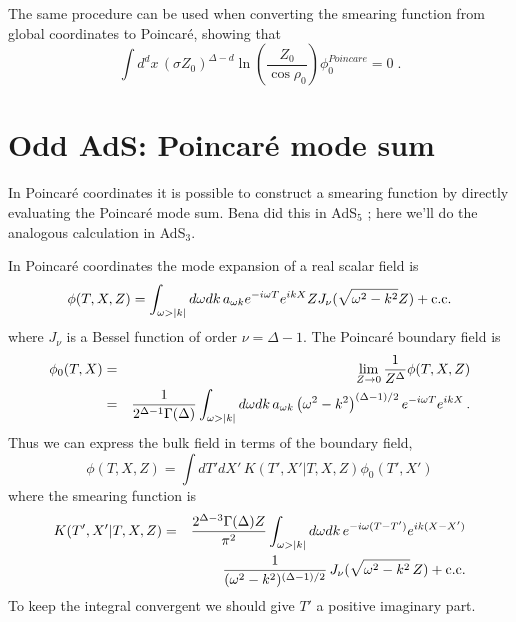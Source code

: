 \documentclass[12pt]{article}
\newcommand{\be}{\begin{equation}}
\newcommand{\ee}{\end{equation}}
\newcommand{\beas}{\begin{eqnarray*}}
\newcommand{\eeas}{\end{eqnarray*}}
\begin{document}
The same procedure can be used when converting the smearing function
from global coordinates to Poincar\'e, showing that
\[
\int d^dx \, (\sigma Z_0)^{\Delta - d} \ln \left( \frac{Z_0}{\cos \rho_0} \right) \phi_0^{Poincare} = 0 \;.
\]

\section{Odd AdS: Poincar\'e mode sum} \label{Poincare3}

In Poincar\'e coordinates it is possible to construct a smearing
function by directly evaluating the Poincar\'e mode sum.  Bena did
this in AdS${}_5$ \cite{Bena}; here we'll do the analogous calculation
in AdS${}_3$.

In Poincar\'e coordinates the mode expansion of a real scalar field is
%
\be
\label{PoincareModeExp}
\phi(T,X,Z) = \int_{\omega > \vert k \vert} d\omega dk \, a_{\omega k} e^{-i \omega T} e^{i k X}
Z J_\nu(\sqrt{\omega^2 - k^2} Z) + {\rm c.c.}
\ee
%
where $J_\nu$ is a Bessel function of order $\nu = \Delta - 1$.  The Poincar\'e boundary field is
%
\beas
\phi_0(T,X) & = & \lim_{Z \rightarrow 0} {1 \over Z^\Delta} \phi(T,X,Z) \\
& = & {1 \over 2^{\Delta - 1} \Gamma(\Delta)} \int_{\omega > \vert k \vert} d\omega dk \,
a_{\omega k} \left(\omega^2 - k^2\right)^{(\Delta - 1)/2} e^{-i \omega T} e^{i k X}\,.
\eeas
%
Thus we can express the bulk field in terms of the boundary field,
%
\be
\phi(T,X,Z) = \int dT' dX' \, K(T',X' \vert T,X,Z) \phi_0(T',X')
\ee
%
where the smearing function is
%
\beas
K(T',X' \vert T,X,Z) & = & {2^{\Delta - 3} \Gamma(\Delta) Z \over \pi^2}
\int_{\omega > \vert k \vert} d\omega dk \,
e^{- i \omega (T - T')} e^{i k (X - X')} \\
& & \qquad {1 \over (\omega^2 - k^2)^{(\Delta - 1)/2}} \,
J_\nu(\sqrt{\omega^2 - k^2} \, Z) + {\rm c.c.}
\eeas
%
To keep the integral convergent we should give $T'$ a positive imaginary part.
\end{document}
